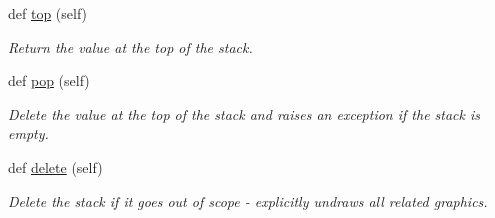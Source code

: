\begin{DoxyCompactItemize}
def \hyperlink{class_stack_1_1_stack_a5f953865bd581272431c9a1664aa43ec}{top} (self)
\begin{DoxyCompactList}\small\item\em Return the value at the top of the stack. \end{DoxyCompactList}\item 
\mbox{\label{class_stack_1_1_stack_a3bc727e674359c79cfd00996895ffe4e}} 
def \hyperlink{class_stack_1_1_stack_a3bc727e674359c79cfd00996895ffe4e}{pop} (self)
\begin{DoxyCompactList}\small\item\em Delete the value at the top of the stack and raises an exception if the stack is empty. \end{DoxyCompactList}\item 
\mbox{\label{class_stack_1_1_stack_a763aefe5c343111354717047aebd7967}} 
def \hyperlink{class_stack_1_1_stack_a763aefe5c343111354717047aebd7967}{delete} (self)
\begin{DoxyCompactList}\small\item\em Delete the stack if it goes out of scope -\/ explicitly undraws all related graphics. \end{DoxyCompactList}\end{DoxyCompactItemize}
